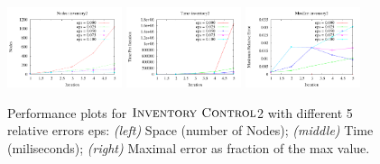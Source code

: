 \begin{figure}[tbp!]
\centering
\includegraphics[width=0.30\textwidth]{Figures/inventory/inventory2Nodes.pdf}
\includegraphics[width=0.30\textwidth]{Figures/inventory/inventory2Time.pdf}
\includegraphics[width=0.30\textwidth]{Figures/inventory/inventory2MaxErr.pdf}
\vspace{-2mm}
\caption{\footnotesize Performance plots for $\textsc{Inventory Control}$2 with different 5 relative errors eps:
{\it (left)}  Space (number of Nodes);
{\it (middle)} Time (miliseconds);
{\it (right)} Maximal error as fraction of the max value.
}
\label{fig:Value}
\vspace{-5mm}
\end{figure}


